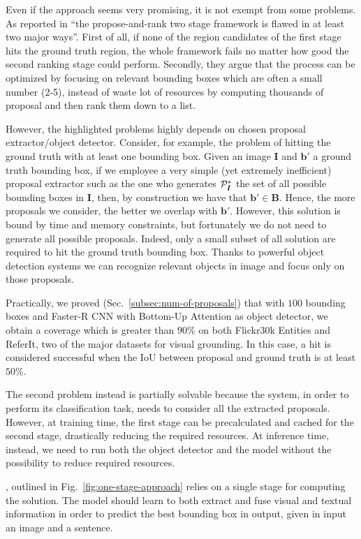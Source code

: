 Even if the approach seems very promising, it is not exempt from some
problems. As reported in \cite{yang2019fast} ``the propose-and-rank
two stage framework is flawed in at least two major ways''. First of
all, if none of the region candidates of the first stage hits the
ground truth region, the whole framework fails no matter how good the
second ranking stage could perform. Secondly, they argue that the
process can be optimized by focusing on relevant bounding boxes which
are often a small number (2-5), instead of waste lot of resources by
computing thousands of proposal and then rank them down to a list.

However, the highlighted problems highly depends on chosen proposal
extractor/object detector. Consider, for example, the problem of
hitting the ground truth with at least one bounding box. Given an
image $\bm{I}$ and $\bm{b}'$ a ground truth bounding box, if we
employee a very simple (yet extremely inefficient) proposal extractor
such as the one who generates $\mathcal{P}^*_{\bm{I}}$ the set of all
possible bounding boxes in $\bm{I}$, then, by construction we have
that $\bm{b}' \in \bm{B}$. Hence, the more proposals we consider, the
better we overlap with $\bm{b}'$. However, this solution is bound by
time and memory constraints, but fortunately we do not need to
generate all possible proposals. Indeed, only a small subset of all
solution are required to hit the ground truth bounding box. Thanks to
powerful object detection systems we can recognize relevant objects in
image and focus only on those proposals.

Practically, we proved (Sec.~\ref{subsec:num-of-proposals}) that with
$100$ bounding boxes and Faster-R CNN with Bottom-Up Attention
\cite{sharma2020understanding} as object detector, we obtain a
coverage which is greater than $90\%$ on both Flickr30k Entities and
ReferIt, two of the major datasets for visual grounding. In this case,
a hit is considered successful when the IoU between proposal and
ground truth is at least $50\%$.

The second problem instead is partially solvable because the system,
in order to perform its classification task, needs to consider all the
extracted proposals. However, at training time, the first stage can be
precalculated and cached for the second stage, drastically reducing
the required resources. At inference time, instead, we need to run
both the object detector and the model without the possibility to
reduce required resources.

, outlined in
Fig.~\ref{fig:one-stage-approach} relies on a single stage for
computing the solution. The model should learn to both extract and
fuse visual and textual information in order to predict the best
bounding box in output, given in input an image and a sentence. 

